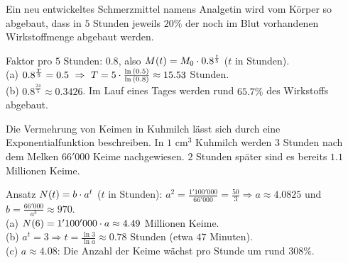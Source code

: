 \documentclass[11pt]{exam}
\begin{document}
\begin{questions}
\question[5]
Ein neu entwickeltes Schmerzmittel namens Analgetin wird vom Körper so abgebaut, dass in $5$ Stunden jeweils $20\%$ der noch im Blut vorhandenen Wirkstoffmenge abgebaut werden.
{\begin{solution}
		Faktor pro $5$ Stunden: $0.8$, also $M(t)=M_0\cdot0.8^{\frac{t}{5}}$ ($t$ in Stunden).\\
		(a) $0.8^{\frac{T}{5}}=0.5\ \Rightarrow\ T=5\*\frac{\ln{0.5}}{\ln{0.8}}\approx15.53$ Stunden.\\
		(b) $0.8^{\frac{24}{5}}\approx0.3426$. Im Lauf eines Tages werden rund $65.7\%$ des Wirkstoffs abgebaut.
\end{solution}}
{}

\question[6]
Die Vermehrung von Keimen in Kuhmilch lässt sich durch eine Exponentialfunktion beschreiben. In $1$ cm$^3$ Kuhmilch werden $3$ Stunden nach dem Melken $66'000$ Keime nachgewiesen. $2$ Stunden später sind es bereits $1.1$ Millionen Keime.
{\begin{solution}
		Ansatz $N(t)=b\cdot a^t$ ($t$ in Stunden): $a^2=\frac{1'100'000}{66'000}=\frac{50}{3}\Rightarrow a\approx4.0825$ und $b=\frac{66'000}{a^3}\approx970$.\\
		(a) $N(6)=1'100'000\cdot a\approx4.49$ Millionen Keime.\\
		(b) $a^t=3\Rightarrow t=\frac{\ln{3}}{\ln{a}}\approx0.78$ Stunden (etwa $47$ Minuten).\\
		(c) $a\approx4.08$: Die Anzahl der Keime wächst pro Stunde um rund $308\%$.
\end{solution}}
{}


\end{questions}
\end{document}
